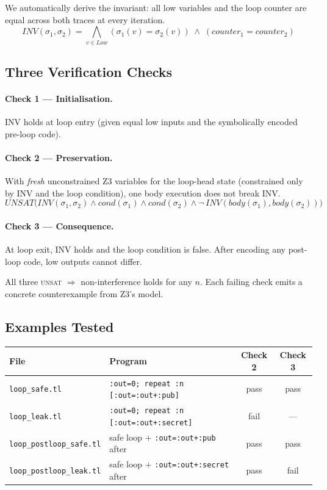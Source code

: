\documentclass[11pt,a4paper]{article}
\begin{document}
We automatically derive the invariant: all low variables and the loop counter
are equal across both traces at every iteration.
\[
  \mathit{INV}(\sigma_1, \sigma_2) =
  \bigwedge_{v \in \mathit{Low}} (\sigma_1(v) = \sigma_2(v))
  \;\wedge\;
  (\mathit{counter}_1 = \mathit{counter}_2)
\]

\subsection*{Three Verification Checks}

\paragraph{Check 1 — Initialisation.} INV holds at loop entry (given equal low
inputs and the symbolically encoded pre-loop code).

\paragraph{Check 2 — Preservation.} With \emph{fresh} unconstrained Z3
variables for the loop-head state (constrained only by INV and the loop
condition), one body execution does not break INV.
\[
  \mathit{UNSAT}\bigl(
    \mathit{INV}(\sigma_1,\sigma_2)
    \wedge \mathit{cond}(\sigma_1)
    \wedge \mathit{cond}(\sigma_2)
    \wedge \neg\,\mathit{INV}(\mathit{body}(\sigma_1), \mathit{body}(\sigma_2))
  \bigr)
\]

\paragraph{Check 3 — Consequence.} At loop exit, INV holds and the loop
condition is false. After encoding any post-loop code, low outputs cannot
differ.

All three \textsc{unsat} $\Rightarrow$ non-interference holds for any $n$.
Each failing check emits a concrete counterexample from Z3's model.

\subsection*{Examples Tested}

\begin{table}[h!]
\centering\small
\begin{tabular}{lp{5cm}cc}
\toprule
\textbf{File} & \textbf{Program} & \textbf{Check 2} & \textbf{Check 3} \\
\midrule
\texttt{loop\_safe.tl}         & \texttt{:out=0; repeat :n [:out=:out+:pub]}                   & pass & pass \\
\texttt{loop\_leak.tl}         & \texttt{:out=0; repeat :n [:out=:out+:secret]}                & fail & ---  \\
\texttt{loop\_postloop\_safe.tl} & safe loop $+$ \texttt{:out=:out+:pub} after                & pass & pass \\
\texttt{loop\_postloop\_leak.tl} & safe loop $+$ \texttt{:out=:out+:secret} after             & pass & fail \\
\bottomrule
\end{tabular}
\end{table}
\end{document}
